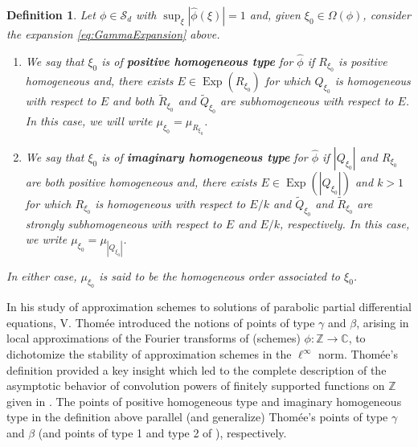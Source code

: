 \documentclass[11pt]{article}
\newtheorem{definition}[theorem]{Definition}
\theoremstyle{remark}
\newcommand\Exp{\operatorname{Exp}}
\begin{document}
\begin{definition}\label{def:Types}
Let $\phi\in\mathcal{S}_d$ with $\sup_{\xi}|\widehat{\phi}(\xi)|=1$ and, given $\xi_0\in\Omega(\phi)$, consider the expansion \eqref{eq:GammaExpansion} above.
\begin{enumerate}
    \item We say that $\xi_0$ is of \textbf{positive homogeneous type} for $\widehat{\phi}$ if $R_{\xi_0}$ is positive homogeneous and, there exists $E\in \Exp(R_{\xi_0})$ for which $Q_{\xi_0}$ is homogeneous with respect to $E$ and both $\widetilde{R}_{\xi_0}$ and $\widetilde{Q}_{\xi_0}$ are subhomogeneous with respect to $E$. In this case, we will write  $\mu_{\xi_0}=\mu_{R_{\xi_0}}$.
\item We say that $\xi_0$ is of \textbf{imaginary homogeneous type} for $\widehat{\phi}$ if $|Q_{\xi_0}|$ and $R_{\xi_0}$ are both positive homogeneous and, there exists $E\in\Exp(|Q_{\xi_0}|)$ and $k>1$ for which $R_{\xi_0}$ is homogeneous with respect to $E/k$ and $\widetilde{Q}_{\xi_0}$ and $\widetilde{R}_{\xi_0}$ are strongly subhomogeneous with respect to $E$ and $E/k$, respectively. In this case, we write $\mu_{\xi_0}=\mu_{|Q_{\xi_0}|}$.
\end{enumerate}
In either case, $\mu_{\xi_0}$ is said to be the homogeneous order associated to $\xi_0$.
\end{definition}


\noindent In his study of approximation schemes to solutions of parabolic partial differential equations, V. Thom\'{e}e introduced the notions of points of type $\gamma$ and $\beta$, arising in local approximations of the Fourier transforms of (schemes) $\phi:\mathbb{Z}\to\mathbb{C}$, to dichotomize the stability of approximation schemes in the $\ell^\infty$ norm\cite{thomee_stability_1965}. Thom\'{e}e's definition provided a key insight which led to the complete description of the asymptotic behavior of convolution powers of finitely supported functions on $\mathbb{Z}$ given in \cite{randles_convolution_2015}. The points of positive homogeneous type and imaginary homogeneous type in the definition above parallel (and generalize) Thom\'{e}e's points of type $\gamma$ and $\beta$ (and points of type 1 and type 2 of \cite{randles_convolution_2015}), respectively.\\
\end{document}
